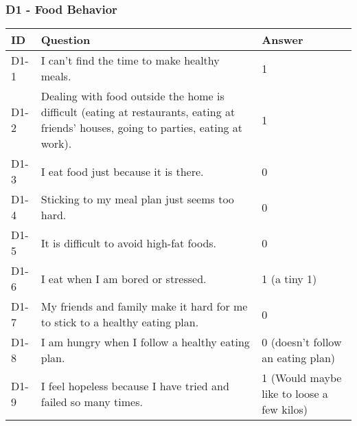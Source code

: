 \subsubsection{D1 - Food Behavior}
\begin{table}[H]
    \centering
    \renewcommand{\arraystretch}{1.2}
    \begin{tabularx}{\textwidth}{|l|X|l|}
        \hline
        \textbf{ID} & \textbf{Question} & \textbf{Answer} \\ \hline
        D1-1 & I can't find the time to make healthy meals. & 
        1 
        \\ \hline
        D1-2 & Dealing with food outside the home is difficult (eating at restaurants, eating at friends' houses, going to parties, eating at work). & 
        1 
        \\ \hline
        D1-3 & I eat food just because it is there. & 
        0 
        \\ \hline
        D1-4 & Sticking to my meal plan just seems too hard. & 
        0  
        \\ \hline
        D1-5 & It is difficult to avoid high-fat foods. & 
        0 
        \\ \hline
        D1-6 & I eat when I am bored or stressed. & 
        1 (a tiny 1) 
        \\ \hline
        D1-7 & My friends and family make it hard for me to stick to a healthy eating plan. & 
        0  
        \\ \hline
        D1-8 & I am hungry when I follow a healthy eating plan. & 
        0 (doesn't follow an eating plan) 
        \\ \hline
        D1-9 & I feel hopeless because I have tried and failed so many times. &  
        1 (Would maybe like to loose a few kilos) 
        \\ \hline
    \end{tabularx}
\end{table}

